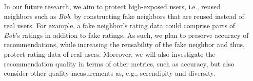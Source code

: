 \documentclass[manuscript,review,anonymous]{acmart}
\newcommand{\dk}[1]{
        \textcolor{blue}{DK: #1}}
\newcommand{\pmu}[1]{
        \textcolor{orange}{PM: #1}}
\begin{document}
In our future research, we aim to protect high-exposed users, i.e., reused neighbors such as \emph{Bob}, by constructing fake neighbors that are reused instead of real users.
For example, a fake neighbor's rating data could comprise parts of \emph{Bob}'s ratings in addition to fake ratings.
As such, we plan to preserve accuracy of recommendations, while increasing the reusability of the fake neighbor and thus, protect rating data of real users.
Moreover, we will also investigate the recommendation quality in terms of other metrics, such as accuracy, but also consider other quality measurements as, e.g., serendipity and diversity.









\end{document}
